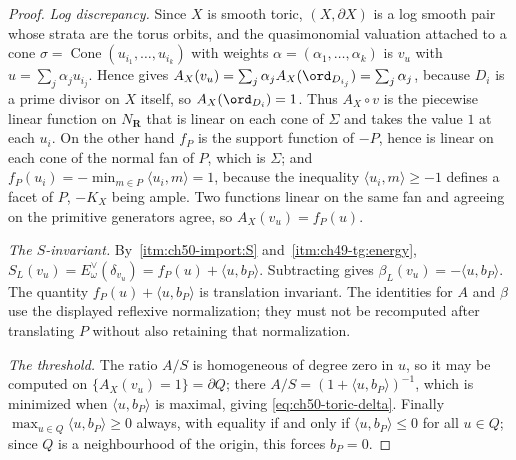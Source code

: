 \begin{proof}
\emph{Log discrepancy.}  Since $X$ is smooth toric,
$(X,\partial X)$ is a log smooth pair whose strata are the torus orbits,
and the quasimonomial valuation attached to a cone
$\sigma=\operatorname{Cone}(u_{i_1},\dots,u_{i_k})$ with weights
$\alpha=(\alpha_1,\dots,\alpha_k)$ is $v_u$ with
$u=\sum_j\alpha_ju_{i_j}$.  Hence
 gives
$A_X(v_u)=\sum_j\alpha_jA_X(\ord_{D_{i_j}})=\sum_j\alpha_j$, because
$D_{i}$ is a prime divisor on $X$ itself, so
$A_X(\ord_{D_i})=1$.  Thus $A_X\circ v$ is the piecewise linear
function on $N_{\mathbf R}$ that is linear on each cone of $\Sigma$ and
takes the value $1$ at each $u_i$.  On the other hand
$f_P$ is the support function of $-P$, hence is linear on each cone of
the normal fan of $P$, which is $\Sigma$; and
$f_P(u_i)=-\min_{m\in P}\langle u_i,m\rangle=1$, because the inequality
$\langle u_i,m\rangle\ge-1$ defines a facet of $P$, $-K_X$ being
ample.  Two functions linear on the same fan and agreeing on the
primitive generators agree, so $A_X(v_u)=f_P(u)$.

\emph{The $S$-invariant.}  By
\,\cref{itm:ch50-import:S} and
\,\cref{itm:ch49-tg:energy},
$S_L(v_u)=E^\vee_\omega(\delta_{v_u})=f_P(u)+\langle u,b_P\rangle$.
Subtracting gives $\beta_L(v_u)=-\langle u,b_P\rangle$.  The quantity $f_P(u)+\langle u,b_P\rangle$ is translation
invariant.  The identities for $A$ and $\beta$ use the displayed
reflexive normalization; they must not be recomputed after translating
$P$ without also retaining that normalization.

\emph{The threshold.}  The ratio $A/S$ is homogeneous of degree zero in
$u$, so it may be computed on $\{A_X(v_u)=1\}=\partial Q$; there
$A/S=(1+\langle u,b_P\rangle)^{-1}$, which is minimized when
$\langle u,b_P\rangle$ is maximal, giving
\eqref{eq:ch50-toric-delta}.  Finally
$\max_{u\in Q}\langle u,b_P\rangle\ge0$ always, with equality if and only
if $\langle u,b_P\rangle\le0$ for all $u\in Q$; since $Q$ is a
neighbourhood of the origin, this forces $b_P=0$.
\end{proof}

